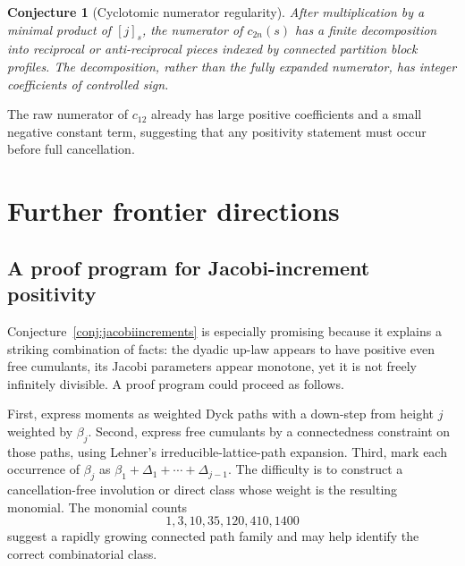 \documentclass[11pt,oneside]{article}
\newtheorem{conjecture}[theorem]{Conjecture}
\theoremstyle{definition}
\theoremstyle{remark}
\begin{document}
\begin{conjecture}[Cyclotomic numerator regularity]\label{conj:cyclotomicnumerator}
After multiplication by a minimal product of \([j]_s\), the numerator of \(c_{2n}(s)\) has a finite decomposition into reciprocal or anti-reciprocal pieces indexed by connected partition block profiles. The decomposition, rather than the fully expanded numerator, has integer coefficients of controlled sign.
\end{conjecture}
The raw numerator of \(c_{12}\) already has large positive coefficients and a small negative constant term, suggesting that any positivity statement must occur before full cancellation.

\section{Further frontier directions}
\subsection{A proof program for Jacobi-increment positivity}
Conjecture~\ref{conj:jacobiincrements} is especially promising because it explains a striking combination of facts: the dyadic up-law appears to have positive even free cumulants, its Jacobi parameters appear monotone, yet it is not freely infinitely divisible. A proof program could proceed as follows.

First, express moments as weighted Dyck paths with a down-step from height \(j\) weighted by \(\beta_j\). Second, express free cumulants by a connectedness constraint on those paths, using Lehner's irreducible-lattice-path expansion. Third, mark each occurrence of \(\beta_j\) as \(\beta_1+\Delta_1+\cdots+\Delta_{j-1}\). The difficulty is to construct a cancellation-free involution or direct class whose weight is the resulting monomial. The monomial counts
\[
1,3,10,35,120,410,1400
\]
suggest a rapidly growing connected path family and may help identify the correct combinatorial class.
\end{document}
